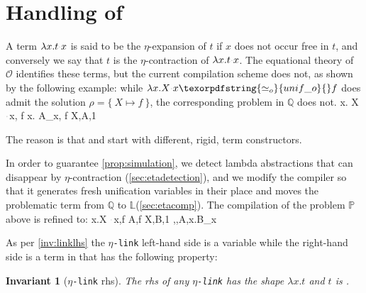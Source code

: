 \documentclass[sigconf,natbib=false,review]{acmart}
\newtheorem{invariant}{Invariant}
\newcommand{\appsep}{\ensuremath{\textcolor{lightgray}{\cdot}}}
\newcommand{\UnifRel}{\ensuremath{\simeq}}
\newcommand{\Uo}{\texorpdfstring{\ensuremath{\UnifRel_o}\xspace}{unif\_o}}
\newcommand{\linkMacro}[1]{\ensuremath{#1}\texttt{-link}\xspace}
\newcommand{\linketa} {\linkMacro{\eta}}
\newcommand{\Fo}{\texorpdfstring{\ensuremath{\mathcal{O}}\xspace}{O}}
\newcommand{\rhs}{rhs\xspace}
\newcommand{\linkStore}{\texorpdfstring{\ensuremath{\mathbb{L}}\xspace}{L}}
\newcommand{\foUnifPb}{\ensuremath{\mathbb{P}}\xspace}
\newcommand{\hoUnifPb}{\ensuremath{\mathbb{Q}}\xspace}
\begin{document}





\section{Handling of \maybeeta}\label{sec:eta}
A term 
$\lambda x. t \appsep x$ is said to be the $\eta$-expansion of $t$ if
$x$ does not occur free in $t$, and conversely we say that $t$ is the $\eta$-contraction of
$\lambda x. t \appsep x$. The equational theory of \Fo{} identifies these terms,
but the current compilation scheme does not,
as shown by the following example:
while $\lambda x.X \appsep x \Uo{} f$ does admit the solution
$\rho = \{~ X \mapsto f ~\}$, the corresponding problem in
\hoUnifPb does not.
%
\printAlll
  {{{\lambda x. X \appsep x, f}}}
  {{{\lambda x. A_x, f}}}
  {{{X,A,1}}}
  {{}}

\noindent
The reason is that  and
 start with different, rigid, term constructors.

In order to guarantee \cref{prop:simulation}, we detect
lambda abstractions that can disappear by $\eta$-contraction
(\cref{sec:etadetection}), and we modify the compiler so that it
generates fresh unification variables
in their place and moves the problematic term 
from \hoUnifPb to \linkStore (\cref{sec:etacomp}). The compilation
of the problem \foUnifPb above is refined to: 
%
\printAlll
  {{{\lambda x.X \appsep x,f}}}
  {{{A,f}}}
  {{{X,B,1}}}
  {{{\eta,,A,\lambda x.B_x}}}

\noindent
As per \cref{inv:linklhs} the \linketa left-hand side is a variable
while the right-hand side is a term in \maybeeta that has the following property:

\begin{invariant}[\linketa \rhs]
  The \rhs of any \linketa %
  has the shape $\lambda x.t$
  and $t$ is \wellb. 
  \label{inv:link-eta-right}
\end{invariant}
\end{document}
